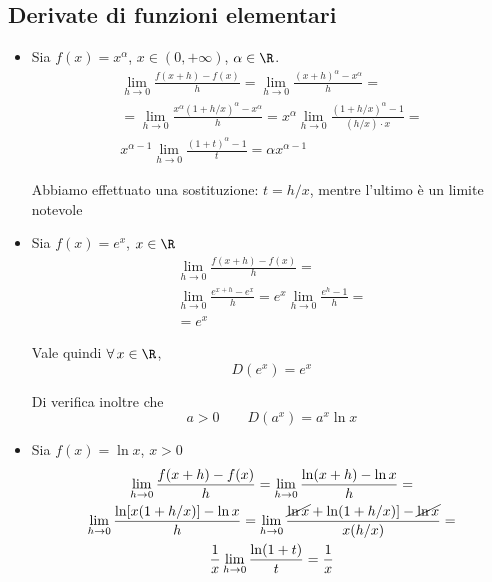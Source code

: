 \subsection{Derivate di funzioni elementari}

\begin{itemize}
    \item Sia $ f(x)=x^{\alpha} $, $ x \in (0,+ \infty) $, $ \alpha \in \R $. \begin{multline*}
        \lim_{h\to 0} \frac{f(x+h)-f(x)}{h} = \lim_{h\to 0} \frac{(x+h)^{\alpha}-x^{\alpha}}{h} =\\
        = \lim_{h\to 0} \frac{x^{\alpha}(1+h/x)^{\alpha}-x^{\alpha}}{h} = x^{\alpha}\lim_{h\to 0} \frac{(1+h/x)^{\alpha}-1}{(h/x) \cdot x} = \\
        x^{\alpha-1} \lim_{h\to 0} \frac{(1+t)^{\alpha}-1}{t} = \alpha x^{\alpha-1}
    \end{multline*}
    
    Abbiamo effettuato una sostituzione: $ t=h/x $, mentre l'ultimo è un limite notevole %
    \item Sia $ f(x)=e^{x} $, $ x \in \R $\begin{multline*}
        \lim_{h\to 0} \frac{f(x+h)-f(x)}{h} = \\
        \lim_{h\to 0} \frac{e^{x+h}-e^{x}}{h} = e^{x} \lim_{h\to 0} \frac{e^{h}-1}{h} = \\
        = e^{x}
    \end{multline*}

    Vale quindi $ \forall\, x \in \R $, \begin{equation}
        D(e^{x})=e^{x}
    \end{equation}

    Di verifica inoltre che \begin{equation}
        a>0\qquad D(a^{x})=a^{x}\ln x
    \end{equation}
    \item Sia $ f(x)=\ln x $, $ x>0 $ \begin{multline*}
        \lim_{h\to 0} \frac{f(x+h)-f(x)}{h} = \lim_{h\to 0} \frac{\ln (x+h)-\ln x}{h} =\\
        \lim_{h\to 0} \frac{\ln [x(1+h/x)]-\ln x}{h}=\lim_{h\to 0} \frac{\cancel{\ln x} + \ln(1+h/x)]-\cancel{\ln x}}{x(h/x)} =\\
        \frac{1}{x} \lim_{h\to 0} \frac{\ln (1+t)}{t} = \frac{1}{x}
    \end{multline*}


\end{itemize}
